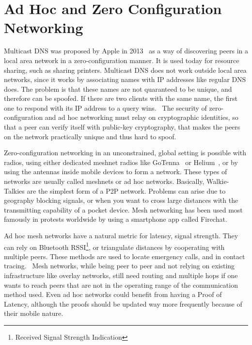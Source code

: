 \section{Ad Hoc and Zero Configuration Networking}
Multicast DNS was proposed by Apple in 2013~\cite{Cheshire2013-ja} as a way of discovering peers in a local area network in a zero-configuration manner. It is used today for resource sharing, such as sharing printers. Multicast DNS does not work outside local area networks, since it works by associating names with IP addresses like regular DNS does. The problem is that these names are not quaranteed to be unique, and therefore can be spoofed. If there are two clients with the same name, the first one to respond with its IP address to a query wins.~\cite{Pdp2008-tg} The security of zero-configuration and ad hoc networking must relay on cryptographic identities, so that a peer can verify itself with public-key cryptography, that makes the peers on the network practically unique and thus hard to spoof.

Zero-configuration networking in an unconstrained, global setting is possible with radios, using either dedicated meshnet radios like GoTenna~\cite{GoTenna_undated-km} or Helium~\cite{Helium_undated-jv}, or by using the antennas inside mobile devices to form a network. These types of networks are usually called meshnets or ad hoc networks. Basically, Walkie-Talkies are the simplest form of a P2P network. Problems can arise due to geography blocking signals, or when you want to cross large distances with the transmitting capability of a pocket device. Mesh networking has been used most famously in protests worldwide by using a smartphone app called Firechat.~\cite{Milian2014-mt}

Ad hoc mesh networks have a natural metric for latency, signal strength. They can rely on Bluetooth RSSI\footnote{Received Signal Strength Indication}, or triangulate distances by cooperating with multiple peers. These methods are used to locate emergency calls, and in contact tracing.~\cite{Biddle2020-kl} Mesh networks, while being peer to peer and not relying on existing infrastructure like overlay networks, still need routing and multiple hops if one wants to reach peers that are not in the operating range of the communication method used. Even ad hoc networks could benefit from having a Proof of Latency, although the proofs should be updated way more frequently because of their mobile nature.

